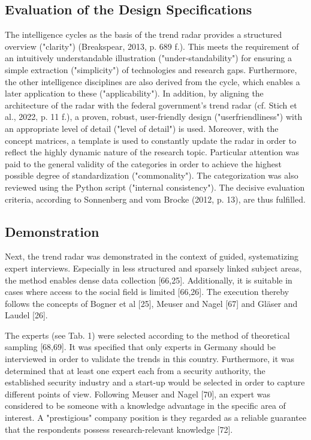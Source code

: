 \documentclass[10pt]{article}
\begin{document}
\subsection{Evaluation of the Design Specifications}

The intelligence cycles as the basis of the trend radar provides a
structured overview ("clarity") (Breakspear, 2013, p. 689 f.). This
meets the requirement of an intuitively understandable illustration
("under-standability") for ensuring a simple extraction ("simplicity")
of technologies and research gaps. Furthermore, the other intelligence
disciplines are also derived from the cycle, which enables a later
application to these ("applicability"). In addition, by aligning the
architecture of the radar with the federal government's trend radar
(cf. Stich et al., 2022, p. 11 f.), a proven, robust, user-friendly
design ("userfriendliness") with an appropriate level of detail
("level of detail") is used. Moreover, with the concept matrices, a
template is used to constantly update the radar in order to reflect
the highly dynamic nature of the research topic. Particular attention
was paid to the general validity of the categories in order to achieve
the highest possible degree of standardization ("commonality"). The
categorization was also reviewed using the Python script ("internal
consistency"). The decisive evaluation criteria, according to
Sonnenberg and vom Brocke (2012, p. 13), are thus fulfilled.

\subsection{Demonstration}

Next, the trend radar was demonstrated in the context of guided,
systematizing expert interviews. Especially in less structured and
sparsely linked subject areas, the method enables dense data collection 
[66,25]. Additionally, it is suitable in cases where access to the
social field is limited [66,26]. The execution thereby follows the
concepts of Bogner et al [25], Meuser and Nagel [67] and Gläser and
Laudel [26].

The experts (see Tab. 1) were selected according to the method of
theoretical sampling [68,69]. It was specified that only experts in
Germany should be interviewed in order to validate the trends in this
country. Furthermore, it was determined that at least one expert each
from a security authority, the established security industry and a
start-up would be selected in order to capture different points of
view. Following Meuser and Nagel [70], an expert was considered to be
someone with a knowledge advantage in the specific area of interest.
A "prestigious" company position is they regarded as a reliable
guarantee that the respondents possess research-relevant knowledge [72].
\end{document}
